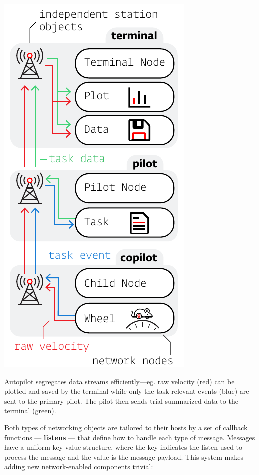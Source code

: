 \begin{marginfigure}[0.8cm]
\includegraphics[]{figures/side_24_networking.pdf}
\caption{Autopilot segregates data streams efficiently---eg. raw velocity (red) can be plotted and saved by the terminal while only the task-relevant events (blue) are sent to the primary pilot. The pilot then sends trial-summarized data to the terminal (green).}
\label{fig:datastreams}
\end{marginfigure}

Both types of networking objects are tailored to their hosts by a set of callback functions --- \textbf{listens} --- that define how to handle each type of message. Messages have a uniform key-value structure, where the key indicates the listen used to process the message and the value is the message payload. This system makes adding new network-enabled components trivial:

